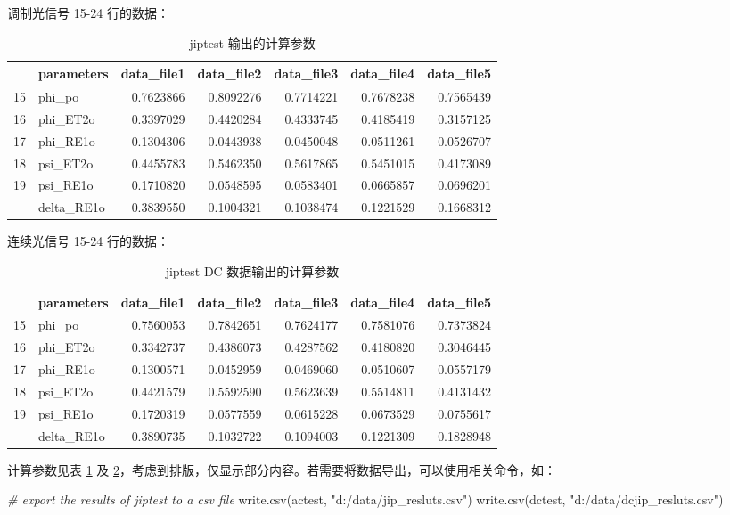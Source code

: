 \documentclass[
]{krantz}
\makeatletter
\newenvironment{Shaded}{\begin{snugshade}}{\end{snugshade}}
\newcommand{\CommentTok}[1]{\textcolor[rgb]{0.56,0.35,0.01}{\textit{#1}}}
\newcommand{\FunctionTok}[1]{\textcolor[rgb]{0.00,0.00,0.00}{#1}}
\newcommand{\NormalTok}[1]{#1}
\newcommand{\StringTok}[1]{\textcolor[rgb]{0.31,0.60,0.02}{#1}}
\newenvironment{kframe}{%
\medskip{}
\setlength{\fboxsep}{.8em}
 \def\at@end@of@kframe{}%
 \ifinner\ifhmode%
  \def\at@end@of@kframe{\end{minipage}}%
  \begin{minipage}{\columnwidth}%
 \fi\fi%
 \def\FrameCommand##1{\hskip\@totalleftmargin \hskip-\fboxsep
 \colorbox{shadecolor}{##1}\hskip-\fboxsep
     \hskip-\linewidth \hskip-\@totalleftmargin \hskip\columnwidth}%
 \MakeFramed {\advance\hsize-\width
   \@totalleftmargin\z@ \linewidth\hsize
   \@setminipage}}%
 {\par\unskip\endMakeFramed%
 \at@end@of@kframe}
\renewenvironment{Shaded}{\begin{kframe}}{\end{kframe}}
\makeatother
\begin{document}
调制光信号 15-24 行的数据：

\begin{longtable}[t]{llrrrrr}
\caption{\label{tab:jipres}jiptest 输出的计算参数}\\
\toprule
  & parameters & data\_file1 & data\_file2 & data\_file3 & data\_file4 & data\_file5\\
\midrule
15 & phi\_po & 0.7623866 & 0.8092276 & 0.7714221 & 0.7678238 & 0.7565439\\
16 & phi\_ET2o & 0.3397029 & 0.4420284 & 0.4333745 & 0.4185419 & 0.3157125\\
17 & phi\_RE1o & 0.1304306 & 0.0443938 & 0.0450048 & 0.0511261 & 0.0526707\\
18 & psi\_ET2o & 0.4455783 & 0.5462350 & 0.5617865 & 0.5451015 & 0.4173089\\
19 & psi\_RE1o & 0.1710820 & 0.0548595 & 0.0583401 & 0.0665857 & 0.0696201\\
\addlinespace
20 & delta\_RE1o & 0.3839550 & 0.1004321 & 0.1038474 & 0.1221529 & 0.1668312\\
\bottomrule
\end{longtable}

连续光信号 15-24 行的数据：

\begin{longtable}[t]{llrrrrr}
\caption{\label{tab:dcjipres}jiptest DC 数据输出的计算参数}\\
\toprule
  & parameters & data\_file1 & data\_file2 & data\_file3 & data\_file4 & data\_file5\\
\midrule
15 & phi\_po & 0.7560053 & 0.7842651 & 0.7624177 & 0.7581076 & 0.7373824\\
16 & phi\_ET2o & 0.3342737 & 0.4386073 & 0.4287562 & 0.4180820 & 0.3046445\\
17 & phi\_RE1o & 0.1300571 & 0.0452959 & 0.0469060 & 0.0510607 & 0.0557179\\
18 & psi\_ET2o & 0.4421579 & 0.5592590 & 0.5623639 & 0.5514811 & 0.4131432\\
19 & psi\_RE1o & 0.1720319 & 0.0577559 & 0.0615228 & 0.0673529 & 0.0755617\\
\addlinespace
20 & delta\_RE1o & 0.3890735 & 0.1032722 & 0.1094003 & 0.1221309 & 0.1828948\\
\bottomrule
\end{longtable}

计算参数见表 \ref{tab:jipres} 及 \ref{tab:dcjipres}，考虑到排版，仅显示部分内容。若需要将数据导出，可以使用相关命令，如：

\begin{Shaded}
\begin{Highlighting}[]
\CommentTok{\# export the results of jiptest to a csv file}
\FunctionTok{write.csv}\NormalTok{(actest, }\StringTok{"d:/data/jip\_resluts.csv"}\NormalTok{)}
\FunctionTok{write.csv}\NormalTok{(dctest, }\StringTok{"d:/data/dcjip\_resluts.csv"}\NormalTok{)}
\end{Highlighting}
\end{Shaded}
\end{document}

